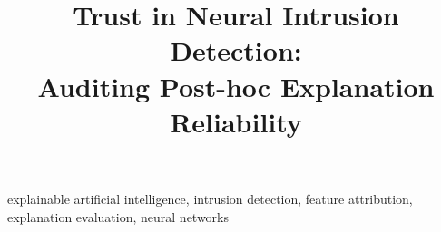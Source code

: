 \documentclass[conference,letterpaper]{IEEEtran}
\title{Trust in Neural Intrusion Detection:\\Auditing Post-hoc Explanation Reliability}
\begin{document}
\maketitle


\begin{IEEEkeywords}
explainable artificial intelligence, intrusion detection, feature attribution,
explanation evaluation, neural networks
\end{IEEEkeywords}








\end{document}
